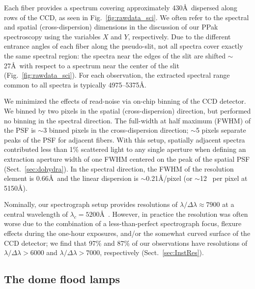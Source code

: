 \documentclass[traditabstract]{aa} %
\begin{document}
Each fiber provides a spectrum covering approximately 430\AA\ dispersed along
rows of the CCD, as seen in Fig.~\ref{fig:rawdata_sci}.  We often refer to the
spectral and spatial (cross-dispersion) dimensions in the discussion of our PPak
spectroscopy using the variables $X$ and $Y$, respectively.  Due to the
different entrance angles of each fiber along the pseudo-slit, not all spectra
cover exactly the same spectral region: the spectra near the edges of the slit
are shifted $\sim$27\AA\ with respect to a spectrum near the center of the slit
(Fig.~\ref{fig:rawdata_sci}).  For each observation, the extracted spectral
range common to all spectra is typically 4975--5375\AA.

We minimized the effects of read-noise via on-chip binning of the CCD detector.
We binned by two pixels in the spatial (cross-dispersion) direction, but
performed no binning in the spectral direction.  The full-width at half maximum
(FWHM) of the PSF is $\sim$3 binned pixels in the cross-dispersion direction;
$\sim$5 pixels separate peaks of the PSF for adjacent fibers.  With this setup,
spatially adjacent spectra contributed less than 1\% scattered light to any
single aperture when defining an extraction aperture width of one FWHM centered
on the peak of the spatial PSF (Sect.~\ref{sec:dohydra}). In the spectral
direction, the FWHM of the resolution element is 0.66\AA\ and the linear
dispersion is $\sim$0.21\AA/pixel (or $\sim$12 \kms\ per pixel at 5150\AA).

Nominally, our spectrograph setup provides resolutions of
$\lambda/\Delta\lambda\approx7900$ at a central wavelength of
$\lambda_c=5200$\AA\ \citep{kelz2006}.  However, in practice the resolution was
often worse due to the combination of a less-than-perfect spectrograph focus,
flexure effects during the one-hour exposures, and/or the somewhat curved surface
of the CCD detector; we find that 97\% and 87\% of our observations have resolutions of
$\lambda/\Delta\lambda>6000$ and $\lambda/\Delta\lambda>7000$, respectively
(Sect.~\ref{sec:InstRes}).

\subsection{The dome flood lamps}
\end{document}
